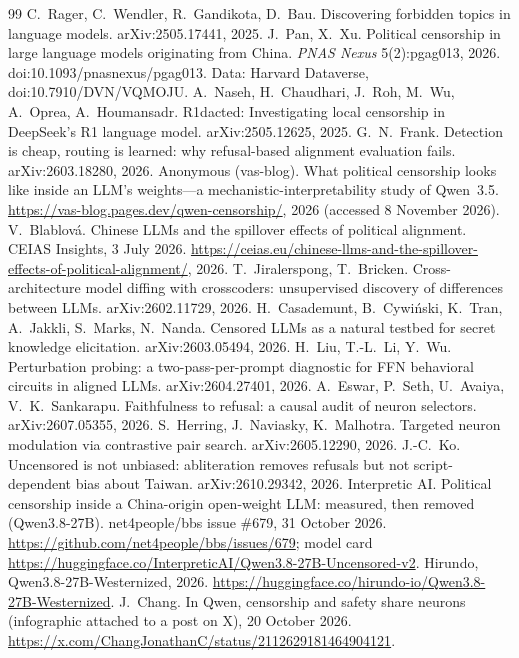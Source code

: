 \documentclass[10pt,a4paper]{article}
\begin{document}
\begin{thebibliography}{99}\footnotesize
{} C.~Rager, C.~Wendler, R.~Gandikota, D.~Bau. Discovering forbidden topics in language models. arXiv:2505.17441, 2025.
 J.~Pan, X.~Xu. Political censorship in large language models originating from China. \emph{PNAS Nexus} 5(2):pgag013, 2026. doi:10.1093/pnasnexus/pgag013. Data: Harvard Dataverse, doi:10.7910/DVN/VQMOJU.
 A.~Naseh, H.~Chaudhari, J.~Roh, M.~Wu, A.~Oprea, A.~Houmansadr. R1dacted: Investigating local censorship in DeepSeek's R1 language model. arXiv:2505.12625, 2025.
 G.~N.~Frank. Detection is cheap, routing is learned: why refusal-based alignment evaluation fails. arXiv:2603.18280, 2026.
 Anonymous (vas-blog). What political censorship looks like inside an LLM's weights---a mechanistic-interpretability study of Qwen~3.5. \url{https://vas-blog.pages.dev/qwen-censorship/}, 2026 (accessed 8 November 2026).
 V.~Blablov\'a. Chinese LLMs and the spillover effects of political alignment. CEIAS Insights, 3 July 2026. \url{https://ceias.eu/chinese-llms-and-the-spillover-effects-of-political-alignment/}, 2026.
 T.~Jiralerspong, T.~Bricken. Cross-architecture model diffing with crosscoders: unsupervised discovery of differences between LLMs. arXiv:2602.11729, 2026.
 H.~Casademunt, B.~Cywi\'nski, K.~Tran, A.~Jakkli, S.~Marks, N.~Nanda. Censored LLMs as a natural testbed for secret knowledge elicitation. arXiv:2603.05494, 2026.
 H.~Liu, T.-L.~Li, Y.~Wu. Perturbation probing: a two-pass-per-prompt diagnostic for FFN behavioral circuits in aligned LLMs. arXiv:2604.27401, 2026.
 A.~Eswar, P.~Seth, U.~Avaiya, V.~K.~Sankarapu. Faithfulness to refusal: a causal audit of neuron selectors. arXiv:2607.05355, 2026.
 S.~Herring, J.~Naviasky, K.~Malhotra. Targeted neuron modulation via contrastive pair search. arXiv:2605.12290, 2026.
 J.-C.~Ko. Uncensored is not unbiased: abliteration removes refusals but not script-dependent bias about Taiwan. arXiv:2610.29342, 2026.
 Interpretic AI. Political censorship inside a China-origin open-weight LLM: measured, then removed (Qwen3.8-27B). net4people/bbs issue \#679, 31 October 2026. \url{https://github.com/net4people/bbs/issues/679}; model card \url{https://huggingface.co/InterpreticAI/Qwen3.8-27B-Uncensored-v2}. Hirundo, Qwen3.8-27B-Westernized, 2026. \url{https://huggingface.co/hirundo-io/Qwen3.8-27B-Westernized}.
 J.~Chang. In Qwen, censorship and safety share neurons (infographic attached to a post on X), 20 October 2026. \url{https://x.com/ChangJonathanC/status/2112629181464904121}.

\end{thebibliography}
\end{document}
